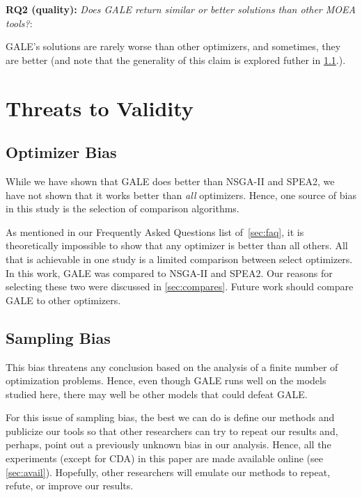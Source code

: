 \documentclass[10pt,journal,compsoc]{IEEEtran}
\newcommand{\tion}[1]{\textsection\ref{sec:#1}}
\begin{document}
{\bf RQ2 (quality):} {\em Does  GALE  return  similar or better solutions than other MOEA tools?}:

GALE's solutions are rarely worse than other optimizers, and sometimes, they are 
better (and note that the generality of this claim is explored futher in \tion{ob}.).


\section{Threats to Validity}


\subsection{Optimizer Bias}\label{sec:ob}
While we have shown that GALE does better than NSGA-II and SPEA2, we have not shown
that it works better than {\em all} optimizers. Hence, one source of bias in this
study is the selection of comparison algorithms.

As mentioned in our Frequently Asked Questions list of~\tion{faq}, 
it is theoretically impossible to show that any optimizer is better than all others.
All that is achievable in one study is a limited comparison between select optimizers. 
In this work, GALE was compared to 
NSGA-II and SPEA2. Our reasons for
selecting these two were discussed in
\tion{compares}.  Future work should compare GALE to other optimizers.

\subsection{ Sampling Bias}
This bias threatens any conclusion based on the
analysis of a finite number of optimization
problems.  Hence, even though GALE runs well on
the models studied here, there may well be other
models that could defeat GALE.  

For this issue of sampling bias, the best we can do
is define our methods and publicize our tools so
that other researchers can try to repeat our results
and, perhaps, point out a previously unknown bias in
our analysis. Hence, all the experiments (except for
CDA) in this paper are made available online (see \tion{avail}).  Hopefully, other
researchers will emulate our methods to repeat,
refute, or improve our results.
\end{document}
